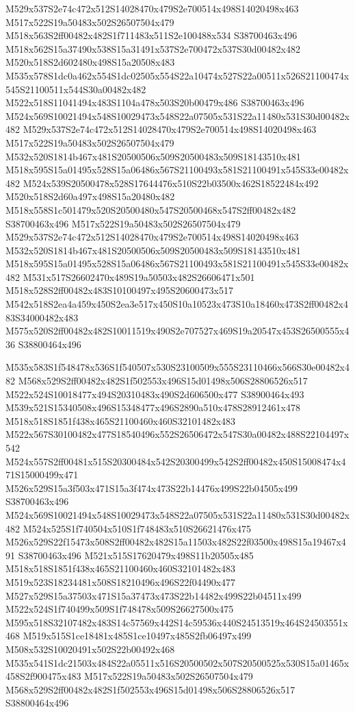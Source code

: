 \documentclass{article}
\begin{document}
\begin{multicols}{2}
M529x537S2e74c472x512S14028470x479S2e700514x498S14020498x463 M517x522S19a50483x502S26507504x479 M518x563S2ff00482x482S1f711483x511S2e100488x534 S38700463x496 M518x562S15a37490x538S15a31491x537S2e700472x537S30d00482x482 M520x518S2d602480x498S15a20508x483 M535x578S1dc0a462x554S1dc02505x554S22a10474x527S22a00511x526S21100474x545S21100511x544S30a00482x482 M522x518S11041494x483S1104a478x503S20b00479x486 S38700463x496 M524x569S10021494x548S10029473x548S22a07505x531S22a11480x531S30d00482x482 M529x537S2e74c472x512S14028470x479S2e700514x498S14020498x463 M517x522S19a50483x502S26507504x479 M532x520S1814b467x481S20500506x509S20500483x509S18143510x481 M518x595S15a01495x528S15a06486x567S21100493x581S21100491x545S33e00482x482 M524x539S20500478x528S17644476x510S22b03500x462S18522484x492 M520x518S2d60a497x498S15a20480x482 M518x558S1c501479x520S20500480x547S20500468x547S2ff00482x482 S38700463x496 M517x522S19a50483x502S26507504x479 M529x537S2e74c472x512S14028470x479S2e700514x498S14020498x463 M532x520S1814b467x481S20500506x509S20500483x509S18143510x481 M518x595S15a01495x528S15a06486x567S21100493x581S21100491x545S33e00482x482 M531x517S26602470x489S19a50503x482S26606471x501 M518x528S2ff00482x483S10100497x495S20600473x517 M542x518S2ea4a459x450S2ea3e517x450S10a10523x473S10a18460x473S2ff00482x483S34000482x483 M575x520S2ff00482x482S10011519x490S2e707527x469S19a20547x453S26500555x436 S38800464x496

M535x583S1f548478x536S1f540507x530S23100509x555S23110466x566S30e00482x482 M568x529S2ff00482x482S1f502553x496S15d01498x506S28806526x517 M522x524S10018477x494S20310483x490S2d606500x477 S38900464x493 M539x521S15340508x496S15348477x496S2890a510x478S28912461x478 M518x518S1851f438x465S21100460x460S32101482x483 M522x567S30100482x477S18540496x552S26506472x547S30a00482x488S22104497x542 M524x557S2ff00481x515S20300484x542S20300499x542S2ff00482x450S15008474x471S15000499x471 M526x529S15a3f503x471S15a3f474x473S22b14476x499S22b04505x499 S38700463x496 M524x569S10021494x548S10029473x548S22a07505x531S22a11480x531S30d00482x482 M524x525S1f740504x510S1f748483x510S26621476x475 M526x529S22f15473x508S2ff00482x482S15a11503x482S22f03500x498S15a19467x491 S38700463x496 M521x515S17620479x498S11b20505x485 M518x518S1851f438x465S21100460x460S32101482x483 M519x523S18234481x508S18210496x496S22f04490x477 M527x529S15a37503x471S15a37473x473S22b14482x499S22b04511x499 M522x524S1f740499x509S1f748478x509S26627500x475 M595x518S32107482x483S14c57569x442S14c59536x440S24513519x464S24503551x468 M519x515S1ce18481x485S1ce10497x485S2fb06497x499 M508x532S10020491x502S22b00492x468 M535x541S1dc21503x484S22a05511x516S20500502x507S20500525x530S15a01465x458S2f900475x483 M517x522S19a50483x502S26507504x479 M568x529S2ff00482x482S1f502553x496S15d01498x506S28806526x517 S38800464x496


\end{multicols}
\end{document}
